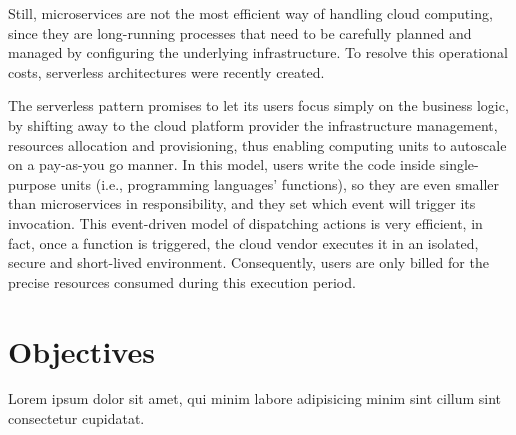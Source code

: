 Still, microservices are not the most efficient way of handling cloud computing,
since they are long-running processes that need to be carefully planned and managed
by configuring the underlying infrastructure. To resolve this operational costs,
serverless architectures were recently created.

The serverless pattern promises to let its users focus simply on the business logic,
by shifting away to the cloud platform provider the infrastructure management,
resources allocation and provisioning, thus enabling computing units to autoscale on a pay-as-you go manner.
In this model, users write the code inside single-purpose units (i.e., programming languages' functions),
so they are even smaller than microservices in responsibility,
and they set which event will trigger its invocation.
This event-driven model of dispatching actions is very efficient, in fact,
once a function is triggered, the cloud vendor executes it in an isolated,
secure and short-lived environment.
Consequently, users are only billed for the precise resources consumed during this execution period.


\section{Objectives} %

Lorem ipsum dolor sit amet, qui minim labore adipisicing minim sint cillum sint consectetur cupidatat.
